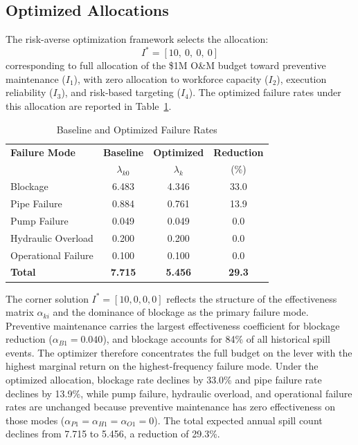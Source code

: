 \documentclass[10pt]{article}
\begin{document}
\begin{multicols}{2}
\subsection{Optimized Allocations}
 
The risk-averse optimization framework selects the allocation:
%
\[
I^* = [10,\ 0,\ 0,\ 0]
\]
%
corresponding to full allocation of the \$1M O\&M budget toward
preventive maintenance ($I_1$), with zero allocation to workforce
capacity ($I_2$), execution reliability ($I_3$), and risk-based
targeting ($I_4$). The optimized failure rates under this allocation
are reported in Table~\ref{tab:optimized-rates}.
 
\begin{table}[H]
\centering
\footnotesize
\caption{Baseline and Optimized Failure Rates}
\label{tab:optimized-rates}
\begin{tabular}{lccc}
\toprule
\textbf{Failure Mode} &
\textbf{Baseline} &
\textbf{Optimized} &
\textbf{Reduction} \\
& $\lambda_{k0}$ & $\lambda_k$ & (\%) \\
\midrule
Blockage            & 6.483 & 4.346 & 33.0 \\
Pipe Failure        & 0.884 & 0.761 & 13.9 \\
Pump Failure        & 0.049 & 0.049 & 0.0  \\
Hydraulic Overload  & 0.200 & 0.200 & 0.0  \\
Operational Failure & 0.100 & 0.100 & 0.0  \\
\midrule
\textbf{Total}      & \textbf{7.715} & \textbf{5.456} & \textbf{29.3} \\
\bottomrule
\end{tabular}
\end{table}
 
The corner solution $I^* = [10,0,0,0]$ reflects the structure of
the effectiveness matrix $\alpha_{ki}$ and the dominance of blockage
as the primary failure mode. Preventive maintenance carries the
largest effectiveness coefficient for blockage reduction
($\alpha_{B1} = 0.040$), and blockage accounts for 84\% of all
historical spill events. The optimizer therefore concentrates the
full budget on the lever with the highest marginal return on the
highest-frequency failure mode. Under the optimized allocation,
blockage rate declines by 33.0\% and pipe failure rate declines
by 13.9\%, while pump failure, hydraulic overload, and operational
failure rates are unchanged because preventive maintenance has zero
effectiveness on those modes ($\alpha_{P1} = \alpha_{H1} =
\alpha_{O1} = 0$). The total expected annual spill count declines
from 7.715 to 5.456, a reduction of 29.3\%.
 

\end{multicols}
\end{document}
